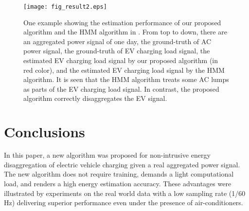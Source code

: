 \documentclass[conference]{IEEEtran}
\begin{document}
\begin{figure}[t]
\centering
\texttt{[image: fig\_result2.eps]}
\caption{One example showing the estimation performance of our proposed algorithm and the HMM algorithm in \cite{parson2012non}. From top to down, there are an aggregated power signal of one day, the ground-truth of AC power signal, the ground-truth of EV charging load signal, the estimated EV charging load signal by our proposed algorithm (in red color), and the estimated EV charging load signal by the HMM algorithm. It is seen that the HMM algorithm treats some AC lumps as parts of the EV charging load signal. In contrast, the proposed algorithm correctly disaggregates the EV signal.}
\label{fig:result2}
\end{figure}







\section{Conclusions}



In this paper, a new algorithm was proposed for non-intrusive energy disaggregation of electric vehicle charging given a real aggregated power signal. The new algorithm does not require training, demands a light computational load, and renders a high energy estimation accuracy.  These advantages were illustrated by experiments on the real world data with a low sampling rate (1/60 Hz) delivering superior performance even under the presence of air-conditioners.





\end{document}

